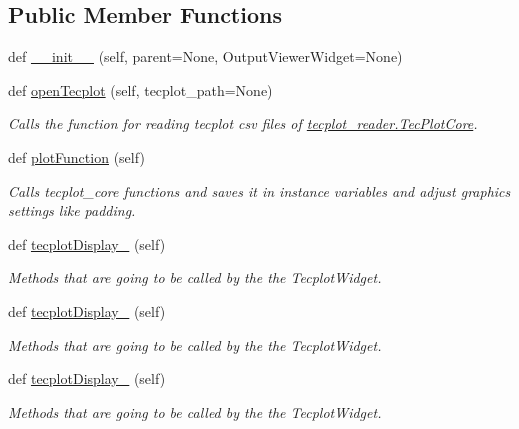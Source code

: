 \subsection*{Public Member Functions}
\begin{DoxyCompactItemize}
\item 
def \hyperlink{classtecplot__modules_1_1tecplot__display_1_1_tec_plot_window_abc270dcf6e8aaa3a645ae0258c4a9e5e}{\+\_\+\+\_\+init\+\_\+\+\_\+} (self, parent=None, Output\+Viewer\+Widget=None)
\item 
def \hyperlink{classtecplot__modules_1_1tecplot__display_1_1_tec_plot_window_a6b4350a2c6ee537dba6bbe1549778636}{open\+Tecplot} (self, tecplot\+\_\+path=None)
\begin{DoxyCompactList}\small\item\em Calls the function for reading tecplot csv files of \hyperlink{classtecplot__modules_1_1tecplot__reader_1_1_tec_plot_core}{tecplot\+\_\+reader.\+Tec\+Plot\+Core}. \end{DoxyCompactList}\item 
def \hyperlink{classtecplot__modules_1_1tecplot__display_1_1_tec_plot_window_a62c9724fbeda8d8780e57559bada3282}{plot\+Function} (self)
\begin{DoxyCompactList}\small\item\em Calls tecplot\+\_\+core functions and saves it in instance variables and adjust graphics settings like padding. \end{DoxyCompactList}\item 
def \hyperlink{classtecplot__modules_1_1tecplot__display_1_1_tec_plot_window_ae792d997329b65cfed0b8a0a5feaa1a2}{tecplot\+Display\+\_} (self)
\begin{DoxyCompactList}\small\item\em Methods that are going to be called by the the Tecplot\+Widget. \end{DoxyCompactList}\item 
def \hyperlink{classtecplot__modules_1_1tecplot__display_1_1_tec_plot_window_aec1f3f862b488e5f66161ca7241908c1}{tecplot\+Display\+\_} (self)
\begin{DoxyCompactList}\small\item\em Methods that are going to be called by the the Tecplot\+Widget. \end{DoxyCompactList}\item 
def \hyperlink{classtecplot__modules_1_1tecplot__display_1_1_tec_plot_window_ae29c235476c3ca1ff19f4b933b86ed86}{tecplot\+Display\+\_} (self)
\begin{DoxyCompactList}\small\item\em Methods that are going to be called by the the Tecplot\+Widget. \end{DoxyCompactList}\item 

\end{DoxyCompactItemize}
